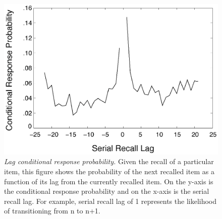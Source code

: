 \begin{figure}
  \centering
  \includegraphics[width=\textwidth]{figures/chapter1_suppfigure2.eps}
  \caption[Behavioral Experiment 3: Lag conditional response probability.]{\textit{Lag conditional response probability.} Given the recall of a particular item, this figure shows the probability of the next recalled item as a function of its lag from the currently recalled item. On the y-axis is the conditional response probability and on the x-axis is the serial recall lag. For example, serial recall lag of 1 represents the likelihood of transitioning from n to n+1.}
  \label{chapter1_suppfigure2}
\end{figure}
